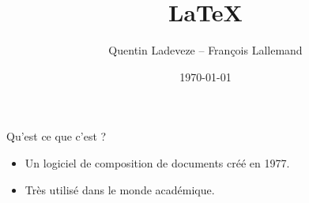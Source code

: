 \documentclass{beamer}
\title{\LaTeX}
\author{Quentin Ladeveze -- François Lallemand}
\date{\today}
\begin{document}
\begin{frame}
  \titlepage
\end{frame}

\begin{frame}{Qu'est ce que c'est ?}

\begin{itemize}
    \item Un logiciel de composition de documents créé en 1977.
    \item Très utilisé dans le monde académique.
\end{itemize}

\end{frame}
\end{document}
